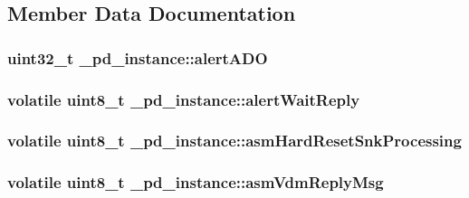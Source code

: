 \subsection{Member Data Documentation}
\hypertarget{struct__pd__instance_a483c8ee561c9edc878c4462f8b073027}{
\subsubsection[{alert\-A\-D\-O}]{\setlength{\rightskip}{0pt plus 5cm}uint32\-\_\-t \-\_\-pd\-\_\-instance\-::alert\-A\-D\-O}}\label{struct__pd__instance_a483c8ee561c9edc878c4462f8b073027}
\hypertarget{struct__pd__instance_ae144ddf17de553d955ce28afa535d4f9}{
\subsubsection[{alert\-Wait\-Reply}]{\setlength{\rightskip}{0pt plus 5cm}volatile uint8\-\_\-t \-\_\-pd\-\_\-instance\-::alert\-Wait\-Reply}}\label{struct__pd__instance_ae144ddf17de553d955ce28afa535d4f9}
\hypertarget{struct__pd__instance_a7420286a3fc5b58010ff2dc607a8d77a}{
\subsubsection[{asm\-Hard\-Reset\-Snk\-Processing}]{\setlength{\rightskip}{0pt plus 5cm}volatile uint8\-\_\-t \-\_\-pd\-\_\-instance\-::asm\-Hard\-Reset\-Snk\-Processing}}\label{struct__pd__instance_a7420286a3fc5b58010ff2dc607a8d77a}
\hypertarget{struct__pd__instance_a3ac03447bd16031091bc4b30da45576f}{
\subsubsection[{asm\-Vdm\-Reply\-Msg}]{\setlength{\rightskip}{0pt plus 5cm}volatile uint8\-\_\-t \-\_\-pd\-\_\-instance\-::asm\-Vdm\-Reply\-Msg}}\label{struct__pd__instance_a3ac03447bd16031091bc4b30da45576f}
